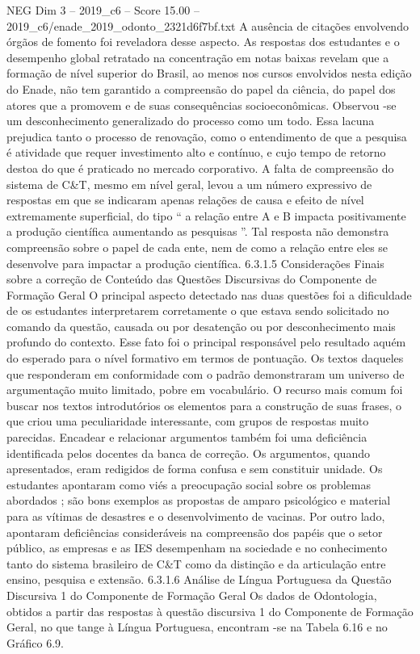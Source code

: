 \begin{textsample}{NEG Dim 3 – 2019\_c6 – Score 15.00 – 2019\_c6/enade\_2019\_odonto\_2321d6f7bf.txt}
A ausência de citações envolvendo órgãos de fomento foi reveladora desse aspecto.
As respostas dos estudantes e o desempenho global retratado na concentração em notas baixas revelam que a formação de nível superior do Brasil, ao menos nos cursos envolvidos nesta edição do Enade, não tem garantido a compreensão do papel da ciência, do papel dos atores que a promovem e de suas consequências socioeconômicas.
Observou -se um desconhecimento generalizado do processo como um todo.
Essa lacuna prejudica tanto o processo de renovação, como o entendimento de que a pesquisa é atividade que requer investimento alto e contínuo, e cujo tempo de retorno destoa do que é praticado no mercado corporativo.
A falta de compreensão do sistema de C\&T, mesmo em nível geral, levou a um número expressivo de respostas em que se indicaram apenas relações de causa e efeito de nível extremamente superficial, do tipo “ a relação entre A e B impacta positivamente a produção científica aumentando as pesquisas ”.
Tal resposta não demonstra compreensão sobre o papel de cada ente, nem de como a relação entre eles se desenvolve para impactar a produção científica. 6.3.1.5 Considerações Finais sobre a correção de Conteúdo das Questões Discursivas do Componente de Formação Geral O principal aspecto detectado nas duas questões foi a dificuldade de os estudantes interpretarem corretamente o que estava sendo solicitado no comando da questão, causada ou por desatenção ou por desconhecimento mais profundo do contexto.
Esse fato foi o principal responsável pelo resultado aquém do esperado para o nível formativo em termos de pontuação.
Os textos daqueles que responderam em conformidade com o padrão demonstraram um universo de argumentação muito limitado, pobre em vocabulário.
O recurso mais comum foi buscar nos textos introdutórios os elementos para a construção de suas frases, o que criou uma peculiaridade interessante, com grupos de respostas muito parecidas.
Encadear e relacionar argumentos também foi uma deficiência identificada pelos docentes da banca de correção.
Os argumentos, quando apresentados, eram redigidos de forma confusa e sem constituir unidade.
Os estudantes apontaram como viés a preocupação social sobre os problemas abordados ; são bons exemplos as propostas de amparo psicológico e material para as vítimas de desastres e o desenvolvimento de vacinas.
Por outro lado, apontaram deficiências consideráveis na compreensão dos papéis que o setor público, as empresas e as IES desempenham na sociedade e no conhecimento tanto do sistema brasileiro de C\&T como da distinção e da articulação entre ensino, pesquisa e extensão. 6.3.1.6 Análise de Língua Portuguesa da Questão Discursiva 1 do Componente de Formação Geral Os dados de Odontologia, obtidos a partir das respostas à questão discursiva 1 do Componente de Formação Geral, no que tange à Língua Portuguesa, encontram -se na Tabela 6.16 e no Gráfico 6.9.

\end{textsample}
